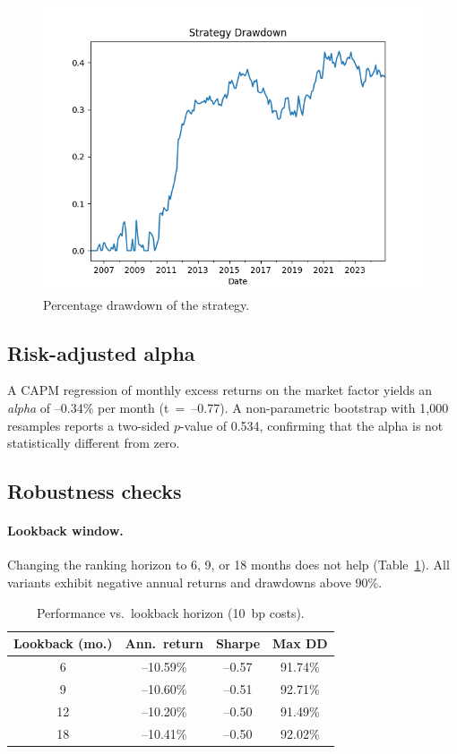 \documentclass[11pt]{article}
\begin{document}
\begin{figure}[h!]
  \centering
  \includegraphics[width=0.85\linewidth]{figures/drawdown.png}
  \caption{Percentage drawdown of the strategy.}
  \label{fig:dd}
\end{figure}

\subsection{Risk-adjusted alpha}
A CAPM regression of monthly excess returns on the market factor yields an \emph{alpha} of --0.34\% per month (t~=~--0.77).  
A non-parametric bootstrap with 1,000 resamples reports a two-sided $p$-value of 0.534, confirming that the alpha is not statistically different from zero.

\subsection{Robustness checks}
\paragraph{Lookback window.}
Changing the ranking horizon to 6, 9, or 18 months does not help (Table~\ref{tab:lookback}).  
All variants exhibit negative annual returns and drawdowns above 90\%.

\begin{table}[h!]
  \centering
  \begin{tabular}{cccc}
    \toprule
    Lookback (mo.) & Ann.\ return & Sharpe & Max DD \\ \midrule
    6  & --10.59\% & --0.57 & 91.74\% \\
    9  & --10.60\% & --0.51 & 92.71\% \\
    12 & --10.20\% & --0.50 & 91.49\% \\
    18 & --10.41\% & --0.50 & 92.02\% \\ \bottomrule
  \end{tabular}
  \caption{Performance vs.\ lookback horizon (10~bp costs).}
  \label{tab:lookback}
\end{table}
\end{document}
